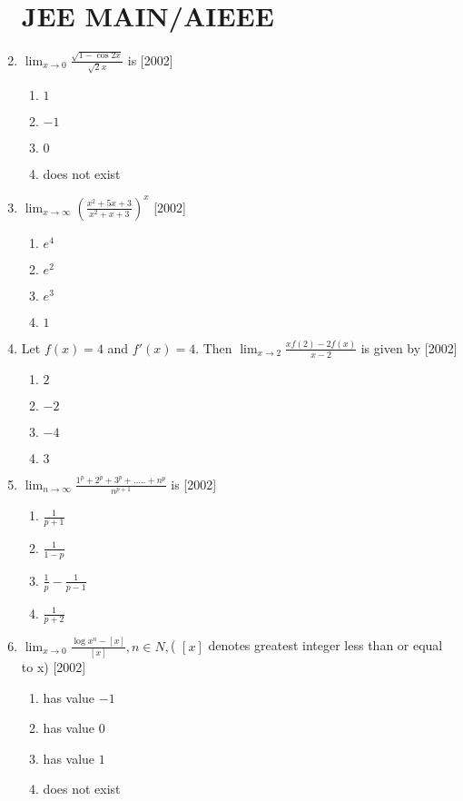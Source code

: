 \documentclass[journal,12pt,twocolumn]{IEEEtran}
\theoremstyle{remark}
\begin{document}
\begin{enumerate}
\section*{\textbf{JEE MAIN/AIEEE}}
    \item $\lim_{x\to 0}{\frac{\sqrt{1-\cos{2x}}}{\sqrt{2}x}}$ is
	    \hfill[2002]
    \begin{enumerate}[label=(\alph*)]
			\item $1$
			\item $-1$
			\item $0$
			\item does not exist
		\end{enumerate}
    \item  $\lim_{x\to \infty}({\frac{x^2+5x+3}{x^2+x+3}})^x$
	    \hfill[2002]
    \begin{enumerate}[label=(\alph*)]
			\item $e^4$
			\item $e^2$
			\item $e^3$
			\item $1$
		\end{enumerate}
    \item Let $f(x)=4$ and $f'(x)=4$. Then $\lim_{x\to 2}{\frac{xf(2)-2f(x)}{x-2}}$ is given by
	    \hfill[2002]
    \begin{enumerate}[label=(\alph*)]
			\item $2$
			\item $-2$
			\item $-4$
			\item $3$
		\end{enumerate}
    \item $\lim_{n\to \infty}{\frac{1^p+2^p+3^p+.....+n^p}{n^{p+1}}}$ is
	    \hfill[2002]
    \begin{enumerate}[label=(\alph*)]
			\item $\frac{1}{p+1}$
			\item $\frac{1}{1-p}$
			\item $\frac{1}{p}-\frac{1}{p-1}$
			\item $\frac{1}{p+2}$
		\end{enumerate}
    \item $\lim_{x\to 0}{\frac{\log x^n- [x]}{[x]}}, n\in N, $( $[x]$ denotes greatest integer less than or equal to x)
	    \hfill[2002]
    \begin{enumerate}[label=(\alph*)]
			\item has value $-1$
			\item has value $0$
			\item has value $1$
			\item does not exist
		\end{enumerate}

\end{enumerate}
\end{document}
